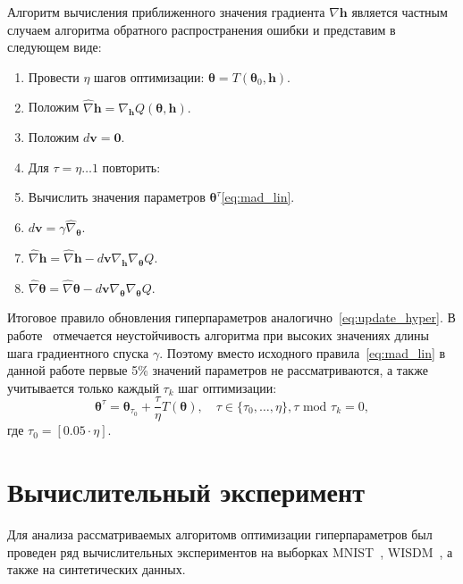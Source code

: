 Алгоритм вычисления приближенного значения градиента $\nabla \mathbf{h}$ является частным случаем алгоритма обратного распространения ошибки и представим в следующем виде:
\begin{enumerate}
\item Провести $\eta$ шагов оптимизации: $\boldsymbol{\theta} = T(\boldsymbol{\theta}_0, \mathbf{h})$.
\item Положим $\hat{\nabla} \mathbf{h} = \nabla_\mathbf{h} Q(\boldsymbol{\theta}, \mathbf{h}).$ 
\item Положим $d\mathbf{v} = \mathbf{0}.$
\item Для $\tau = \eta \dots 1 $ повторить:
\item Вычислить значения параметров $\boldsymbol{\theta}^\tau$\eqref{eq:mad_lin}.
\item $d\mathbf{v} =  \gamma \hat{\nabla}_{\boldsymbol{\theta}}$.
\item $\hat{\nabla} \mathbf{h} =  \hat{\nabla} \mathbf{h} - d\mathbf{v}\nabla_{\mathbf{h}} \nabla_{\boldsymbol{\theta}} Q$.
\item $\hat{\nabla} \boldsymbol{\theta}  = \hat{\nabla} \boldsymbol{\theta}  - d\mathbf{v}\nabla_{\boldsymbol{\theta}} \nabla_{\boldsymbol{\theta}} Q$.
\end{enumerate}

Итоговое правило обновления гиперпараметров аналогично~\eqref{eq:update_hyper}.
В работе~\cite{hyper_mad} отмечается неустойчивость алгоритма при высоких значениях длины шага градиентного спуска $\gamma$. Поэтому вместо исходного правила~\eqref{eq:mad_lin} в данной работе первые 5\% значений параметров не рассматриваются, а также учитывается только каждый $\tau_k$ шаг оптимизации:
\begin{equation}
\label{eq:mad_lin2}
\boldsymbol{\theta}^\tau = \boldsymbol{\theta}_{\tau_0} + \frac{\tau}{\eta} T(\boldsymbol{\theta}), \quad \tau \in \{\tau_0,\dots,\eta\}, \tau \text{ mod } \tau_k = 0,
\end{equation}
где $\tau_0 = [0.05 \cdot \eta]$.


\section{Вычислительный эксперимент}
Для анализа рассматриваемых алгоритомв оптимизации гиперпараметров был проведен ряд вычислительных экспериментов на выборках MNIST~\cite{mnist}, WISDM~\cite{wisdm}, а также на синтетических данных.

